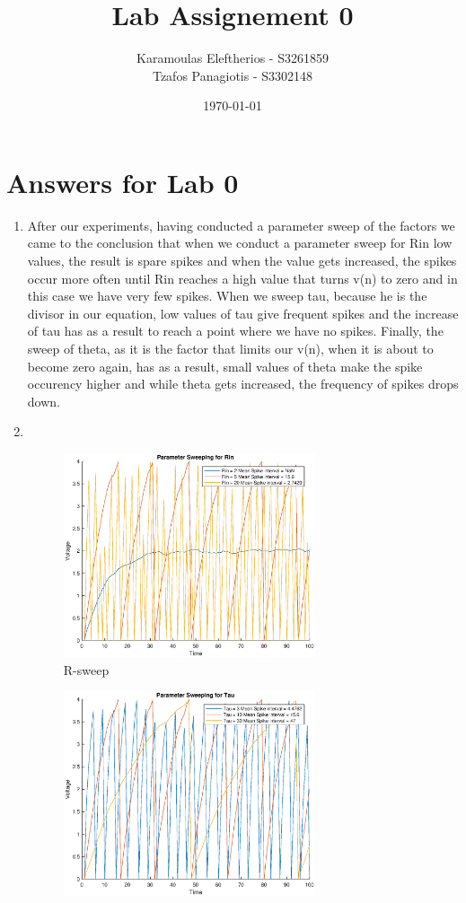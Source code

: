 \documentclass{article}
\title{Lab Assignement 0}
\date{\today}
\author{
	Karamoulas Eleftherios - S3261859\\
	Tzafos Panagiotis - S3302148\\
}
\begin{document}
\maketitle
\section{Answers for Lab 0}
\begin{enumerate}
\item
After our experiments, having conducted a parameter sweep of the factors we came to the conclusion that when we conduct a parameter sweep for Rin low values, the result is spare spikes and when the value gets increased, the spikes occur more often until Rin reaches a high value that turns v(n) to zero and in this case we have very few spikes. When we sweep tau, because he is the divisor in our equation, low values of tau give frequent spikes and the increase of tau has as a result to reach a point where we have no spikes. Finally, the sweep of theta, as it is the factor that limits our v(n), when it is about to become zero again, has as a result, small values of theta make the spike occurency higher and while theta gets increased, the frequency of spikes drops down.
\item ~
\begin{figure}[H]
    \centering
    \includegraphics[width=0.7\textwidth]{im/Rin-Sweep.eps}
    \caption{R-sweep}
    \label{fig:plot}
  \end{figure}
  \begin{figure}[H]
    \centering
    \includegraphics[width=0.7\textwidth]{im/Tau-Sweep.eps}

\end{figure}
\end{enumerate}
\end{document}
